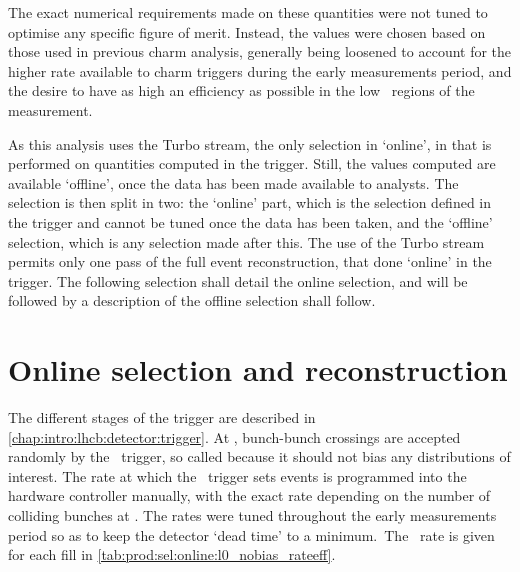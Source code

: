 The exact numerical requirements made on these quantities were not tuned to 
optimise any specific figure of merit.
Instead, the values were chosen based on those used in previous charm analysis, 
generally being loosened to account for the higher rate available to charm 
triggers during the early measurements period, and the desire to have as high 
an efficiency as possible in the low \pT\ regions of the measurement.

As this analysis uses the Turbo stream, the only selection in `online', in that 
is performed on quantities computed in the trigger.
Still, the values computed are available `offline', once the data has been made 
available to analysts.
The selection is then split in two: the `online' part, which is the selection 
defined in the trigger and cannot be tuned once the data has been taken, and 
the `offline' selection, which is any selection made after this.
The use of the Turbo stream permits only one pass of the full event 
reconstruction, that done `online' in the trigger.
The following selection shall detail the online selection, and will be followed 
by a description of the offline selection shall follow.

\section{Online selection and reconstruction}
\label{chap:prod:sel:online}

The different stages of the trigger are described in 
\cref{chap:intro:lhcb:detector:trigger}.
At \lzero, bunch-bunch crossings are accepted randomly by the \nobias\ trigger, 
so called because it should not bias any distributions of interest.
The rate at which the \nobias\ trigger sets events is programmed into the 
hardware controller manually, with the exact rate depending on the number of 
colliding bunches at \lhcb.
The rates were tuned throughout the early measurements period so as to keep the 
detector `dead time' to a minimum.\footnotemark\
The \lzero\ rate is given for each fill in 
\cref{tab:prod:sel:online:l0_nobias_rateeff}.

